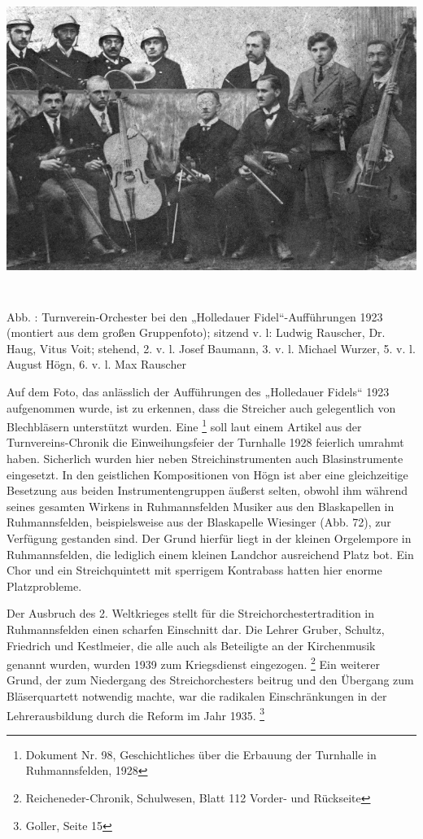 \includegraphics[width=15.822cm,height=10.109cm]{pictures/zulassungsarbeit-img072.jpg}


Abb. : Turnverein-Orchester bei den
„Holledauer Fidel“-Aufführungen 1923 (montiert aus dem großen
Gruppenfoto); sitzend v. l: Ludwig Rauscher, Dr. Haug, Vitus Voit;
stehend, 2. v. l. Josef Baumann, 3. v. l. Michael Wurzer, 5. v. l.
August Högn, 6. v. l. Max Rauscher

Auf dem Foto, das anlässlich der Aufführungen des „Holledauer Fidels“
1923 aufgenommen wurde, ist zu erkennen, dass die Streicher auch
gelegentlich von Blechbläsern unterstützt wurden. Eine
  \footnote{Dokument Nr. 98, Geschichtliches über die Erbauung
der Turnhalle in Ruhmannsfelden, 1928} soll laut einem Artikel aus der
Turnvereins-Chronik die Einweihungsfeier der Turnhalle 1928 feierlich
umrahmt haben. Sicherlich wurden hier neben Streichinstrumenten auch
Blasinstrumente eingesetzt. In den geistlichen Kompositionen von Högn
ist aber eine gleichzeitige Besetzung aus beiden Instrumentengruppen
äußerst selten, obwohl ihm während seines gesamten Wirkens in
Ruhmannsfelden Musiker aus den Blaskapellen in Ruhmannsfelden,
beispielsweise aus der Blaskapelle Wiesinger (Abb. 72), zur Verfügung
gestanden sind. Der Grund hierfür liegt in der kleinen Orgelempore in
Ruhmannsfelden, die lediglich einem kleinen Landchor ausreichend Platz
bot. Ein Chor und ein Streichquintett mit sperrigem Kontrabass hatten
hier enorme Platzprobleme.

Der Ausbruch des 2. Weltkrieges stellt für die Streichorchestertradition
in Ruhmannsfelden einen scharfen Einschnitt dar. Die Lehrer Gruber,
Schultz, Friedrich und Kestlmeier, die alle auch als Beteiligte an der
Kirchenmusik genannt wurden, wurden 1939 zum Kriegsdienst
eingezogen. \footnote{Reicheneder-Chronik, Schulwesen, Blatt 112
Vorder- und Rückseite} Ein weiterer Grund, der zum Niedergang des
Streichorchesters beitrug und den Übergang zum Bläserquartett notwendig
machte, war die radikalen Einschränkungen in der Lehrerausbildung durch
die Reform im Jahr 1935. \footnote{Goller, Seite 15}

